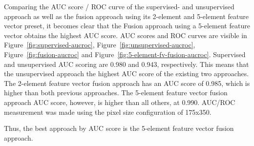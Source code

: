 Comparing the AUC score / ROC curve of the supervised- and unsupervised approach as well as the fusion approach using its 2-element and 5-element feature vector preset, it becomes clear that the Fusion approach using a 5-element feature vector obtains the highest AUC score. AUC scores and ROC curves are visible in Figure~\ref{fig:supervised-aucroc}, Figure~\ref{fig:unsupervised-aucroc}, Figure~\ref{fig:fusion-aucroc} and Figure~\ref{fig:5-element-fv-fusion-aucroc}. Supervised and unsupervised AUC scoring are 0.980 and 0.943, respectively. This means that the unsupervised approach the highest AUC score of the existing two approaches. The 2-element feature vector fusion approach has an AUC score of 0.985, which is higher than both previous approaches. The 5-element feature vector fusion approach AUC score, however, is higher than all others, at 0.990. AUC/ROC measurement was made using the pixel size configuration of 175x350. 


Thus, the best approach by AUC score is the 5-element feature vector fusion approach.




